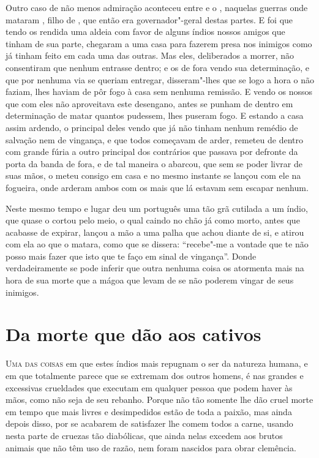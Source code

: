 Outro caso de não menos admiração aconteceu entre  e o
, naquelas guerras onde mataram , filho de , que então era governador"-geral destas partes. E foi que tendo os
 rendida uma aldeia com favor de alguns índios nossos amigos que
tinham de sua parte, chegaram a uma casa para fazerem presa nos inimigos
como já tinham feito em cada uma das outras. Mas eles, deliberados a
morrer, não consentiram que nenhum entrasse dentro; e os de fora vendo
sua determinação, e que por nenhuma via se queriam entregar,
disseram"-lhes que se logo a hora o não faziam, lhes haviam de pôr fogo à
casa sem nenhuma remissão. E vendo os nossos que com eles não
aproveitava este desengano, antes se punham de dentro em determinação
de matar quantos pudessem, lhes puseram fogo. E estando a casa assim
ardendo, o principal deles vendo que já não tinham nenhum remédio de			%
salvação nem de vingança, e que todos começavam de arder, remeteu de
dentro com grande fúria a outro principal dos contrários que passava
por defronte da porta da banda de fora, e de tal maneira o abarcou, que
sem se poder livrar de suas mãos, o meteu consigo em casa e no mesmo
instante se lançou com ele na fogueira, onde arderam ambos com os mais
que lá estavam sem escapar nenhum.

Neste mesmo tempo e lugar deu um português uma tão grã cutilada a um
índio, que quase o cortou pelo meio, o qual caindo no chão já como			
morto, antes que acabasse de expirar, lançou a mão a uma palha que achou
diante de si, e atirou com ela ao que o matara, como que se dissera: ``recebe"-me 
a vontade que te não posso mais fazer que isto que te faço em
sinal de vingança''. Donde verdadeiramente se pode inferir que outra
nenhuma coisa os atormenta mais na hora de sua morte que a mágoa 
que levam de se não poderem vingar de seus inimigos.



\chapter[Da morte que dão aos cativos]{Da morte que dão aos cativos} 



\noindent\textsc{Uma das coisas} em que estes índios mais repugnam o ser da natureza
humana, e em que totalmente parece que se extremam dos outros homens, é
nas grandes e excessivas crueldades que executam em qualquer pessoa que
podem haver às mãos, como não seja de seu rebanho. Porque não tão
somente lhe dão cruel morte em tempo que mais livres e desimpedidos
estão de toda a paixão, mas ainda depois disso, por se acabarem de			%
satisfazer lhe comem todos a carne, usando nesta parte de cruezas tão			%
diabólicas, que ainda nelas excedem aos brutos animais que não têm uso
de razão, nem foram nascidos para obrar clemência. 

